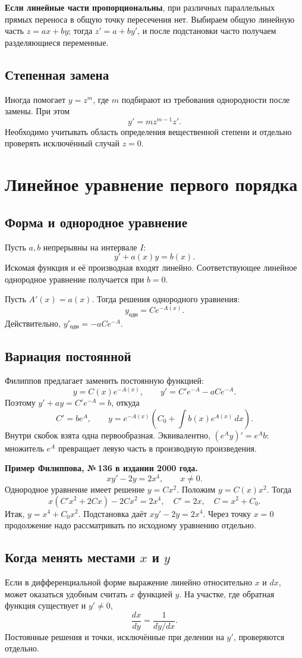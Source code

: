 \documentclass[12pt,a4paper]{article}
\begin{document}
\textbf{Если линейные части пропорциональны}, при различных параллельных прямых переноса в общую точку пересечения нет. Выбираем общую линейную часть $z=ax+by$; тогда $z'=a+by'$, и после подстановки часто получаем разделяющиеся переменные.

\subsection{Степенная замена}
Иногда помогает $y=z^m$, где $m$ подбирают из требования однородности после замены. При этом
\[
y'=m z^{m-1}z'.
\]
Необходимо учитывать область определения вещественной степени и отдельно проверять исключённый случай $z=0$.

\section{Линейное уравнение первого порядка}
\subsection{Форма и однородное уравнение}
Пусть $a,b$ непрерывны на интервале $I$:
\[
y'+a(x)y=b(x).
\]
Искомая функция и её производная входят линейно. Соответствующее линейное однородное уравнение получается при $b=0$.

Пусть $A'(x)=a(x)$. Тогда решения однородного уравнения:
\[
y_{\text{одн}}=Ce^{-A(x)}.
\]
Действительно, $y'_{\text{одн}}=-aCe^{-A}$.

\subsection{Вариация постоянной}
Филиппов предлагает заменить постоянную функцией:
\[
y=C(x)e^{-A(x)},\qquad
y'=C'e^{-A}-aCe^{-A}.
\]
Поэтому $y'+ay=C'e^{-A}=b$, откуда
\[
C'=be^A,\qquad
\boxed{y=e^{-A(x)}
\left(C_0+\int b(x)e^{A(x)}\,dx\right)}.
\]
Внутри скобок взята одна первообразная. Эквивалентно, $(e^Ay)'=e^Ab$: множитель $e^A$ превращает левую часть в производную произведения.

\textbf{Пример Филиппова, №\,136 в издании 2000 года.}
\[
xy'-2y=2x^4,\qquad x\ne0.
\]
Однородное уравнение имеет решение $y=Cx^2$. Положим $y=C(x)x^2$. Тогда
\[
x(C'x^2+2Cx)-2Cx^2=2x^4,
\quad C'=2x,\quad C=x^2+C_0.
\]
Итак, $y=x^4+C_0x^2$. Подстановка даёт $xy'-2y=2x^4$. Через точку $x=0$ продолжение надо рассматривать по исходному уравнению отдельно.

\subsection{Когда менять местами $x$ и $y$}
Если в дифференциальной форме выражение линейно относительно $x$ и $dx$, может оказаться удобным считать $x$ функцией $y$. На участке, где обратная функция существует и $y'\ne0$,
\[
\frac{dx}{dy}=\frac1{dy/dx}.
\]
Постоянные решения и точки, исключённые при делении на $y'$, проверяются отдельно.
\end{document}
